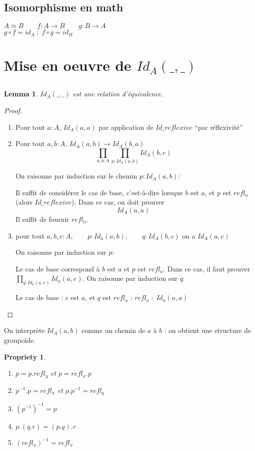 \documentclass{article}
\newtheorem{prop}{Propriety}
\newtheorem{lemma}{Lemma}
\begin{document}
\subsection*{Isomorphisme en math}
$A \simeq B \qquad f: A \to B \qquad g : B \to A$\\
$g \circ f = id_A \;;\; f\circ g = id_B$

\section{Mise en oeuvre de $Id_A(\_,\_)$}
\subsection{}
\begin{lemma}
$Id_A(\_,\_)$ est une relation d'équivalence.
\end{lemma}

\begin{proof}
\begin{enumerate}[label=\roman*)]
\item Pour tout $a : A$, $Id_A(a,a)$ par application de $Id\_reflexive$ ``par réflexivité''
\item Pour tout $a,b : A$, $Id_A(a,b)\to Id_A(b,a)$
\[ \prod_{a,b : A}\prod_{p:Id_A (a,b)} Id_A(b,c)\]

On raisonne par induction sur le chemin $p:Id_A(a,b)$:

Il suffit de considérer le cas de base, c'est-à-dire lorsque $b$ est $a$, et $p$ est $refl_a$ (alors $Id\_reflexive$). Dans ce cas, on doit prouver 
\[Id_A(a,a)\]
Il suffit de fournir $refl_a$.
\item pour tout $a,b,c : A,\qquad p:Id_a(a,b),\qquad q:Id_A(b,c)$ on a $Id_A(a,c)$

On raisonne par induction sur $p$:

Le cas de base correspond à $b$ est $a$ et $p$ est $refl_a$. Dans ce cas, il faut prouver $\prod_{q:Id_a(a,e)} Id_a (a,e)$. On raisonne par induction sur $q$:

Le cas de base : $c$ est $a$, et $q$ est $refl_a$ : $refl_a\; : \; Id_a(a,a)$
\end{enumerate}
\end{proof}

On interprète $Id_A(a,b)$ comme un chemin de $a$ à $b$ : on obtient une structure de groupoïde.

\begin{prop}
\begin{enumerate}[label=\roman*)]
\item $p=p.refl_y$ et $p=refl_x.p$
\item $p^{-1}.p=refl_x$ et $p.p^{-1}=refl_y$
\item $(p^{-1})^{-1}=p$
\item $p.(q.r)=(p.q).r$
\item $(refl_x)^{-1} = refl_x$
\end{enumerate}
\end{prop}
\end{document}
